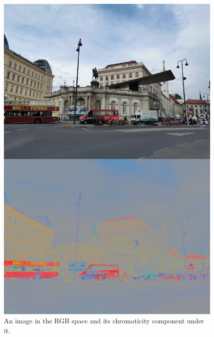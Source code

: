 \documentclass[twocolumn]{svjour3}          %
\begin{document}
\begin{figure}[!ht]
\setlength{\lineskip}{0pt}
\vspace{-4.0cm}
  \centering
   \includegraphics[scale=0.25,natwidth=1280,natheight=1920]{8.jpg} 
  \caption{An image in the RGB space and its chromaticity component under it.}
  \label{fig:example1}
 \end{figure} 
\end{document}
